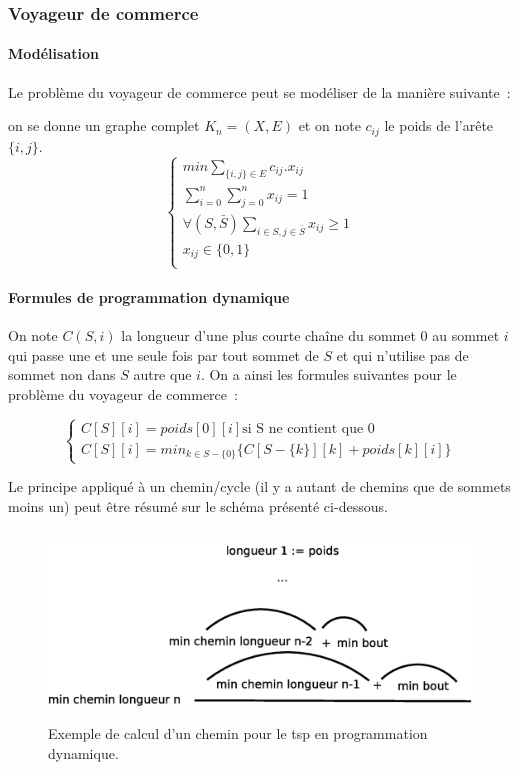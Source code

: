 \documentclass[a4paper, 12pt]{article}
\begin{document}
\subsubsection{Voyageur de commerce}

\paragraph{Modélisation}

Le problème du voyageur de commerce peut se modéliser de la manière
suivante~:


on se donne un graphe complet $K_n=(X,E)$ et on note $c_{ij}$ le poids
de l'arête $\{i,j\}$.
\begin{equation}
\begin{cases}
min \sum_{\{i, j\} \in E} c_{ij}.x_{ij} \\
\sum_{i=0}^n \sum_{j=0}^n x_{ij} = 1 \\
\forall (S, \bar{S}) \sum_{i \in S, j \in \bar{S}} x_{ij} \geq 1 \\
x_{ij} \in \{0, 1\} \\
\end{cases}
\end{equation}

\paragraph{Formules de programmation dynamique}

On note $C(S,i)$ la longueur d'une plus courte chaîne du sommet $0$ au
sommet $i$ qui passe une et une seule fois par tout sommet de $S$ et
qui n'utilise pas de sommet non dans $S$ autre que $i$. On a ainsi les
formules suivantes pour le problème du voyageur de commerce~:

\begin{equation}
\begin{cases}
C[S][i] = poids[0][i] \text{si S ne contient que $0$} \\
C[S][i] = min_{k \in S - \{ 0 \}} \{ C[S- \{ k \}][k] + poids[k][i]  \}
\end{cases}
\end{equation}

Le principe appliqué à un chemin/cycle (il y a autant de chemins que de
sommets moins un) peut être résumé sur le schéma présenté ci-dessous.

\begin{figure}[!ht]
\begin{center}
\includegraphics[height=5cm]{../images/tspDyn.eps}
\end{center}
\caption{Exemple de calcul d'un chemin pour le tsp en programmation dynamique.}
\end{figure}
\end{document}
